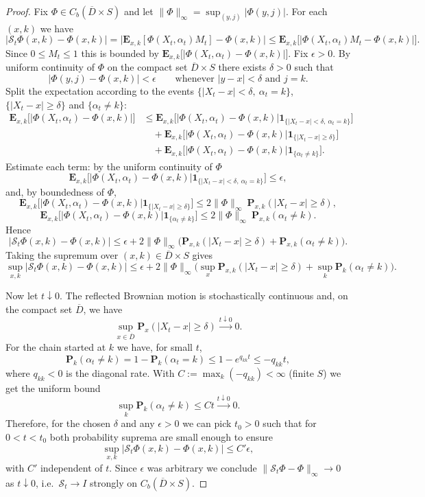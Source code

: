 \documentclass[11pt]{amsart}
\theoremstyle{plain}
\theoremstyle{definition}
\theoremstyle{remark}
\begin{document}
\begin{proof}
	Fix $\Phi\in C_b(\overline D\times S)$ and let $\|\Phi\|_\infty=\sup_{(y,j)}|\Phi(y,j)|$. For each $(x,k)$ we have
	\[
	\big|\mathcal S_t\Phi(x,k)-\Phi(x,k)\big|
	= \big|\mathbf E_{x,k}[\Phi(X_t,\alpha_t)M_t]-\Phi(x,k)\big|
	\le \mathbf E_{x,k}\big[|\Phi(X_t,\alpha_t)M_t-\Phi(x,k)|\big].
	\]
	Since $0\le M_t\le1$ this is bounded by $\mathbf E_{x,k}\big[|\Phi(X_t,\alpha_t)-\Phi(x,k)|\big]$. Fix $\epsilon>0$. By uniform continuity of $\Phi$ on the compact set $\overline D\times S$ there exists $\delta>0$ such that
	\[
	|\Phi(y,j)-\Phi(x,k)|<\epsilon\qquad\text{whenever }|y-x|<\delta\text{ and }j=k.
	\]
	Split the expectation according to the events $\{|X_t-x|<\delta,\ \alpha_t=k\}$, $\{|X_t-x|\ge\delta\}$ and $\{\alpha_t\ne k\}$:
	\begin{align*}
		\mathbf E_{x,k}\big[|\Phi(X_t,\alpha_t)-\Phi(x,k)|\big]
		&\le \mathbf E_{x,k}\big[|\Phi(X_t,\alpha_t)-\Phi(x,k)|\mathbf1_{\{|X_t-x|<\delta,\ \alpha_t=k\}}\big]\\
		&\quad + \mathbf E_{x,k}\big[|\Phi(X_t,\alpha_t)-\Phi(x,k)|\mathbf1_{\{|X_t-x|\ge\delta\}}\big]\\
		&\quad + \mathbf E_{x,k}\big[|\Phi(X_t,\alpha_t)-\Phi(x,k)|\mathbf1_{\{\alpha_t\ne k\}}\big].
	\end{align*}
	Estimate each term: by the uniform continuity of \(\Phi\) 
	\[
	\mathbf E_{x,k}\big[|\Phi(X_t,\alpha_t)-\Phi(x,k)|\mathbf1_{\{|X_t-x|<\delta,\ \alpha_t=k\}}\big]\le\epsilon,
	\]
	and, by boundedness of $\Phi$,
	\[
	\mathbf E_{x,k}\big[|\Phi(X_t,\alpha_t)-\Phi(x,k)|\mathbf1_{\{|X_t-x|\ge\delta\}}\big]\le 2\|\Phi\|_\infty\ \mathbf P_{x,k}(|X_t-x|\ge\delta),
	\]
	\[
	\mathbf E_{x,k}\big[|\Phi(X_t,\alpha_t)-\Phi(x,k)|\mathbf1_{\{\alpha_t\ne k\}}\big]\le 2\|\Phi\|_\infty\ \mathbf P_{x,k}(\alpha_t\ne k).
	\]
	Hence
	\[
	\big|\mathcal S_t\Phi(x,k)-\Phi(x,k)\big|
	\le \epsilon + 2\|\Phi\|_\infty\Big(\mathbf P_{x,k}(|X_t-x|\ge\delta)+\mathbf P_{x,k}(\alpha_t\ne k)\Big).
	\]
	Taking the supremum over $(x,k)\in\overline D\times S$ gives
	\[
	\sup_{x,k}\big|\mathcal S_t\Phi(x,k)-\Phi(x,k)\big|
	\le \epsilon + 2\|\Phi\|_\infty\Big(\sup_{x}\mathbf P_{x,k}(|X_t-x|\ge\delta)+\sup_{k}\mathbf P_{k}(\alpha_t\ne k)\Big).
	\]
	
	Now let $t\downarrow0$. The reflected Brownian motion is stochastically continuous and, on the compact set $\overline D$, we have
	\[
	\sup_{x\in\overline D}\mathbf P_x(|X_t-x|\ge\delta)\xrightarrow{t\downarrow0}0.
	\]
	For the chain started at $k$ we have, for small $t$,
	\[
	\mathbf{P}_k(\alpha_t\neq k)= 1 - \mathbf{P}_k(\alpha_t= k) \leq 1 - e^{q_{kk}t} \leq -q_{kk}t,
	\]
	where $q_{kk}<0$ is the diagonal rate. With $C:=\max_{k}(-q_{kk})<\infty$ (finite $S$) we get the uniform bound
	\[
	\sup_k\mathbf P_k(\alpha_t\ne k) \le C t \xrightarrow{t\downarrow0}0.
	\]
	Therefore, for the chosen $\delta$ and any $\epsilon>0$ we can pick $t_0>0$ such that for $0<t<t_0$ both probability suprema are small enough to ensure
	\[
	\sup_{x,k}\big|\mathcal S_t\Phi(x,k)-\Phi(x,k)\big| \le C'\epsilon,
	\]
	with $C'$ independent of $t$. Since $\epsilon$ was arbitrary we conclude $\|\mathcal S_t\Phi-\Phi\|_\infty\to0$ as $t\downarrow0$, i.e.\ $\mathcal S_t\to I$ strongly on $C_b(\overline D\times S)$.
	

\end{proof}
\end{document}
